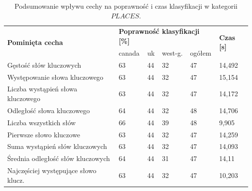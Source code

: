 \documentclass{classrep}
\begin{document}
\begin{table}[!ht]
    \centering
    \begin{tabular}{|l||l|l|l|l|l|}
    \hline
    \multirow{2}{*}{\textbf{Pominięta cecha}} & \multicolumn{4}{l|}{\textbf{Poprawność klasyfikacji [\%]}} & \multirow{2}{*}{\textbf{Czas [s]}} \\ \cline{2-5}
                                              & canada      & uk         & west-g.          & ogółem       &                                        \\ \hline
    Gęstość słów kluczowych                   & 63          & 44         & 32               & 47           & 14,492                                 \\ \hline
    Występowanie słowa kluczowego             & 63          & 44         & 32               & 47           & 15,154                                 \\ \hline
    Liczba wystąpień słowa kluczowego         & 63          & 44         & 32               & 47           & 14,172                                 \\ \hline
    Odległość słowa kluczowego                & 64          & 44         & 32               & 48           & 14,706                                 \\ \hline
    Liczba wszystkich słów                    & 66          & 44         & 39               & 48           & 9,905                                  \\ \hline
    Pierwsze słowo kluczowe                   & 63          & 44         & 32               & 47           & 14,259                                 \\ \hline
    Suma wystąpień słów kluczowych            & 63          & 44         & 32               & 47           & 14,093                                 \\ \hline
    Średnia odległość słów kluczowych         & 64          & 44         & 31               & 47           & 14,11                                  \\ \hline
    Najczęściej występujące słowo klucz.      & 63          & 44         & 32               & 47           & 10,203                                 \\ \hline
    \end{tabular}
    \caption{Podsumowanie wpływu cechy na poprawność i czas klasyfikacji w kategorii $PLACES$.}
\end{table}

\FloatBarrier
\end{document}
